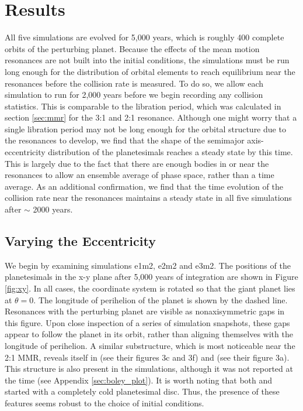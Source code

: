 
\section{Results} \label{sec:jup_results}

All five simulations are evolved for 5,000 years, which is roughly 400 complete orbits of the perturbing planet. Because the 
effects of the mean motion resonances are not built into the initial conditions, the simulations must be run long enough for the 
distribution of orbital elements to reach equilibrium near the resonances before the collision rate is measured. To do so, we allow 
each simulation to run for 2,000 years before we begin recording any collision statistics. This is comparable to the libration 
period, which was calculated in section \ref{sec:mmr} for the 3:1 and 2:1 resonance. Although one might worry that a single 
libration period may not be long enough for the orbital structure due to the resonances to develop, we find that the shape of the 
semimajor axis-eccentricity distribution of the planetesimals reaches a steady state by this time. This is largely due to the fact 
that there are enough bodies in or near the resonances to allow an ensemble average of phase space, rather than a time 
average. As an additional confirmation, we find that the time evolution of the collision rate near the resonances maintains a 
steady state in all five simulations after $\sim$ 2000 years.

\subsection{Varying the Eccentricity} \label{sec:vary_ecc}

We begin by examining simulations e1m2, e2m2 and e3m2. The positions of the planetesimals in the x-y plane after 5,000 years 
of integration are shown in Figure \ref{fig:xy}. In all cases, the coordinate system is rotated so that the giant planet lies at $\theta 
= 0$. The longitude of perihelion of the planet is shown by the dashed line. Resonances with the perturbing planet are visible as 
nonaxisymmetric gaps in this figure. Upon close inspection of a series of simulation snapshots, these gaps appear to follow the 
planet in its orbit, rather than aligning themselves with the longitude of perihelion. A similar substructure, which is most 
noticeable near the 2:1 MMR, reveals itself in \cite{richardson00} (see their figures 3c and 3f) and \cite{tabeshian16} (see their 
figure 3a). This structure is also present in the \cite{boley17} simulations, although it was not reported at the time (see Appendix 
\ref{sec:boley_plot}). It is worth noting that both \cite{richardson00} and \cite{boley17} started with a completely cold 
planetesimal disc. Thus, the presence of these features seems robust to the choice of initial conditions.

